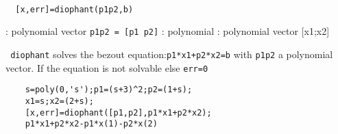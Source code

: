 
\begin{mandesc}
   \\ %
\end{mandesc}
\begin{calling_sequence}
\begin{verbatim}
  [x,err]=diophant(p1p2,b)  
\end{verbatim}
\end{calling_sequence}
\begin{parameters}
  \begin{varlist}
    : polynomial vector \verb!p1p2 = [p1 p2]!
    : polynomial
    : polynomial vector [x1;x2]
  \end{varlist}
\end{parameters}
\begin{mandescription}
  \verb! diophant! solves the bezout equation:\verb!p1*x1+p2*x2=b! with  \verb!p1p2! a polynomial vector.
  If the equation is not solvable
  else \verb!err=0!
\end{mandescription}
\begin{examples}
  \begin{Verbatim}
    s=poly(0,'s');p1=(s+3)^2;p2=(1+s);
    x1=s;x2=(2+s);
    [x,err]=diophant([p1,p2],p1*x1+p2*x2);
    p1*x1+p2*x2-p1*x(1)-p2*x(2)
  \end{Verbatim}
\end{examples}
